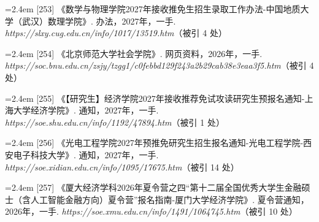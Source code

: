 {\vspace{0.6pt}
\vspace{3.5pt}\par
\nopagebreak\vspace{1pt}
\noindent\hangindent=2.4em \label{src:S0324}{\color{cAccent}[253]} 《数学与物理学院2027年接收推免生招生录取工作办法-中国地质大学（武汉）数理学院》. 办法，2027年，一手. \textit{https://slxy.cug.edu.cn/info/1017/13519.htm}（被引 4 处）\par
\vspace{0.6pt}
\vspace{3.5pt}\par
\nopagebreak\vspace{1pt}
\noindent\hangindent=2.4em \label{src:S0326}{\color{cAccent}[254]} 《北京师范大学社会学院》. 网页资料，2026年，一手. \textit{https://soc.bnu.edu.cn/zsjy/tzgg1/c0febbd129f243a2b29cab38e3eaa3f5.htm}（被引 4 处）\par
\vspace{0.6pt}
\vspace{3.5pt}\par
\nopagebreak\vspace{1pt}
\noindent\hangindent=2.4em \label{src:S0327}{\color{cAccent}[255]} 《【研究生】经济学院2027年接收推荐免试攻读研究生预报名通知-上海大学经济学院》. 通知，2027年，一手. \textit{https://soe.shu.edu.cn/info/1192/47894.htm}（被引 1 处）\par
\vspace{0.6pt}
\vspace{3.5pt}\par
\nopagebreak\vspace{1pt}
\noindent\hangindent=2.4em \label{src:S0328}{\color{cAccent}[256]} 《光电工程学院2027年预推免研究生招生报名通知-光电工程学院-西安电子科技大学》. 通知，2027年，一手. \textit{https://soe.xidian.edu.cn/info/1095/17675.htm}（被引 14 处）\par
\vspace{0.6pt}
\vspace{3.5pt}\par
\nopagebreak\vspace{1pt}
\noindent\hangindent=2.4em \label{src:S0329}{\color{cAccent}[257]} 《厦大经济学科2026年夏令营之四“第十二届全国优秀大学生金融硕士（含人工智能金融方向）夏令营”报名指南-厦门大学经济学院》. 夏令营通知，2026年，一手. \textit{https://soe.xmu.edu.cn/info/1491/1064745.htm}（被引 10 处）\par
}
